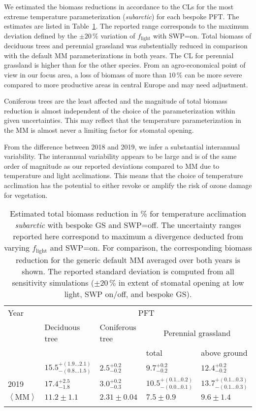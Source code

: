 \documentclass[bg, manuscript]{copernicus}
\begin{document}
We estimated the biomass reductions in accordance to the CLs \citep{ICP:MappingManual2017, ESPR:Hayes2021} for the most extreme temperature parameterization (\emph{subarctic}) for each bespoke PFT. The estimates are listed in Table~\ref{tab:biomass_reduction}. The reported range corresponds to the maximum deviation defined by the $\pm 20\,\unit{\%}$ variation of $f_\mathrm{light}$ with SWP=on. Total biomass of deciduous trees and perennial grassland was substentially reduced in comparison with the default MM parameterizations in both years. The CL for perennial grassland is higher than for the other species. From an agro-economical point of view in our focus area, a loss of biomass of more than $10\,\unit{\%}$ can be more severe compared to more productive areas in central Europe and may need adjustment.

Coniferous trees are the least affected and the magnitude of total biomass reduction is almost independent of the choice of the parameterization within given uncertainties. This may reflect that the temperature parameterization in the MM is almost never a limiting factor for stomatal opening.

From the difference between 2018 and 2019, we infer a substantial interannual variability. The interannual variability appears to be large and is of the same order of magnitude as our reported deviations compared to MM due to temperature and light acclimations. This means that the choice of temperature acclimation has the potential to either revoke or amplify the risk of ozone damage for vegetation. 

\begin{table}[t]
  \caption{Estimated total biomass reduction in \unit{\%} for temperature acclimation \emph{subarctic} with bespoke GS and SWP=off. The uncertainty ranges reported here correspond to maximum a divergence deducted from varying $f_\mathrm{light}$ and SWP=on. For comparison, the corresponding biomass reduction for the generic default MM averaged over both years is shown. The reported standard deviation is computed from all sensitivity simulations ($\pm 20\,\unit{\%}$ in extent of stomatal opening at low light, SWP on/off, and bespoke GS).}
  \label{tab:biomass_reduction}
\begin{tabular}{lllll}
\tophline
Year & \multicolumn{4}{c}{PFT}\\
& Deciduous tree& Coniferous tree & \multicolumn{2}{c}{Perennial grassland}\\
& & & total & above ground\\
\middlehline
2018 & $15.5^{+(1.9...2.1)}_{-(0.8...1.5)}$ & $2.5^{+0.2}_{-0.2}$ & $9.7^{+0.2}_{-0.2}$ & $12.4^{+0.2}_{-0.2}$\\
2019 & $17.4^{+2.5}_{-1.8}$ & $3.0^{+0.2}_{-0.3}$ & $10.5^{+(0.1...0.2)}_{-(0.0...0.1)}$ & $13.7^{+(0.1...0.3)}_{-(0.1...0.3)}$\\
\middlehline
$\left<\mathrm{MM}\right>$ & $11.2\pm 1.1$ & $2.31\pm 0.04$ & $7.5\pm 0.9$ & $9.6\pm 1.4$\\
\bottomhline
\end{tabular}
\end{table}
\end{document}
